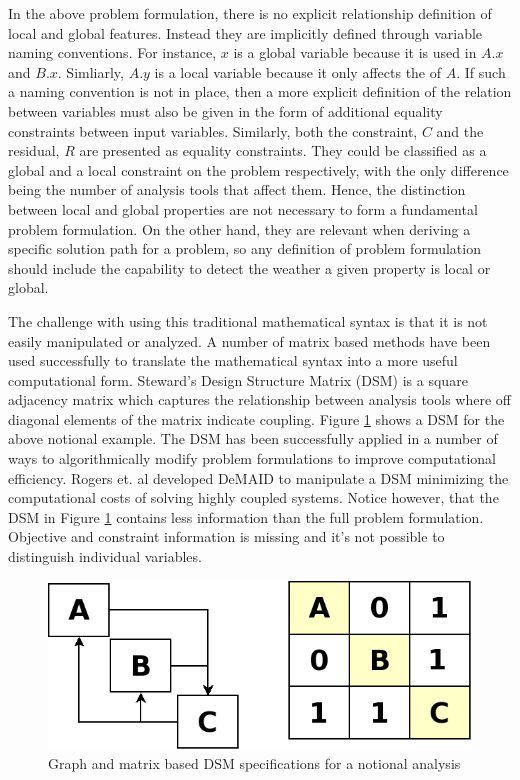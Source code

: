 \documentclass[]{aiaa-tc} %
\begin{document}
    In the above problem formulation, there is no explicit relationship definition of local and global features. Instead they are 
    implicitly defined through variable naming conventions. For instance, $x$ is a global variable because it is used in $A.x$ and $B.x$. 
    Simliarly, $A.y$ is a local variable because it only affects the of $A$. If such a naming convention is not in place, 
    then a more explicit definition of the relation between variables must also be given in the form of additional equality constraints between 
    input variables. Similarly, both the constraint, $C$ and the residual, $R$ are presented as equality constraints. They could be classified as 
    a global and a local constraint on the problem respectively, with the only difference being the number of analysis tools that affect them.  
    Hence, the distinction between local and global properties are not necessary to form a fundamental 
    problem formulation. On the other hand, they are relevant when deriving a specific solution path for a problem, so any definition of problem 
    formulation should include the capability to detect the weather a given property is local or global. 

    The challenge with using this traditional mathematical syntax is that it is not easily manipulated or analyzed. 
    A number of matrix based methods have been used successfully to translate the mathematical syntax into a more useful computational form. 
    Steward's Design Structure Matrix (DSM) is a square adjacency matrix which captures the relationship between analysis tools where off 
    diagonal elements of the matrix indicate coupling\cite{Steward1981}. Figure \ref{fig:dsm_simple} shows a DSM for the above notional example. 
    The DSM has been successfully applied in a number of ways to algorithmically modify problem formulations to 
    improve computational efficiency. Rogers et. al developed DeMAID to manipulate a
    DSM  minimizing the computational costs of solving highly coupled systems\cite{Rogers1996}. Notice however, that the DSM in 
    Figure \ref{fig:dsm_simple} contains less information than the full problem formulation. Objective and constraint information 
    is missing and it's not possible to distinguish individual variables.

    \begin{figure}[!hbp]
        \begin{center}
        \includegraphics[width=.75\textwidth]{images/dsm_simple}
        \caption{Graph and matrix based DSM specifications for a notional analysis \label{fig:dsm_simple}}
        \end{center}
    \end{figure}
\end{document}
